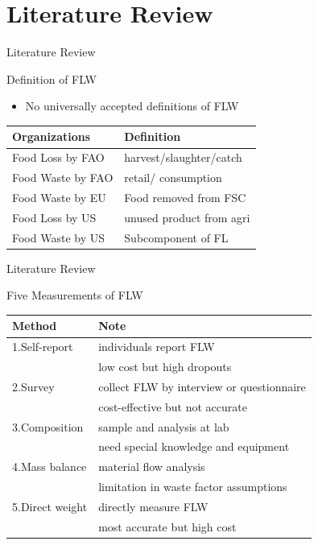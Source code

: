 \documentclass[
  ignorenonframetext,
]{beamer}
\providecommand{\tightlist}{%
  \setlength{\itemsep}{0pt}\setlength{\parskip}{0pt}}
\begin{document}
\hypertarget{literature-review}{%
\section{Literature Review}\label{literature-review}}

\begin{frame}{Literature Review}
\protect\hypertarget{literature-review-1}{}
\begin{block}{Definition of FLW}
\protect\hypertarget{definition-of-flw}{}
\begin{itemize}
\tightlist
\item
  No universally accepted definitions of FLW
\end{itemize}

\begin{longtable}[]{@{}ll@{}}
\toprule()
Organizations & Definition \\
\midrule()
\endhead
Food Loss by FAO & harvest/slaughter/catch \\
Food Waste by FAO & retail/ consumption \\
Food Waste by EU & Food removed from FSC \\
Food Loss by US & unused product from agri \\
Food Waste by US & Subcomponent of FL \\
\bottomrule()
\end{longtable}
\end{block}
\end{frame}

\begin{frame}{Literature Review}
\protect\hypertarget{literature-review-2}{}
\begin{block}{Five Measurements of FLW}
\protect\hypertarget{five-measurements-of-flw}{}
\begin{longtable}[]{@{}ll@{}}
\toprule()
Method & Note \\
\midrule()
\endhead
1.Self-report & individuals report FLW \\
& low cost but high dropouts \\
2.Survey & collect FLW by interview or questionnaire \\
& cost-effective but not accurate \\
3.Composition & sample and analysis at lab \\
& need special knowledge and equipment \\
4.Mass balance & material flow analysis \\
& limitation in waste factor assumptions \\
5.Direct weight & directly measure FLW \\
& most accurate but high cost \\
\bottomrule()
\end{longtable}
\end{block}
\end{frame}
\end{document}
